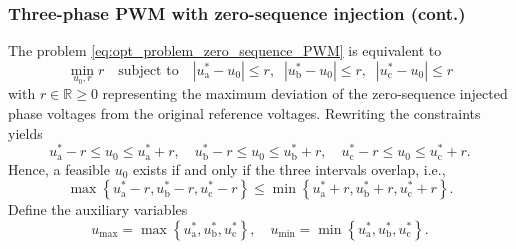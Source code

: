 \begin{frame}
    \frametitle{Three-phase PWM with zero-sequence injection (cont.)}
    The problem \eqref{eq:opt_problem_zero_sequence_PWM} is equivalent to
    \begin{equation}
        \min_{u_0, r} r \quad \text{subject to} \quad |u^*_\mathrm{a}-u_0| \leq r, \;\; |u^*_\mathrm{b}-u_0| \leq r, \;\; |u^*_\mathrm{c}-u_0| \leq r
    \end{equation}
    with $r\in\mathbb{R}\geq 0$ representing the maximum deviation of the zero-sequence injected phase voltages from the original reference voltages. \pause Rewriting the constraints yields
    \begin{equation}
        u_\mathrm{a}^* - r \leq u_0 \leq u_\mathrm{a}^* + r, \quad u_\mathrm{b}^* - r \leq u_0 \leq u_\mathrm{b}^* + r, \quad u_\mathrm{c}^* - r \leq u_0 \leq u_\mathrm{c}^* + r.
    \end{equation}\pause%
    Hence, a feasible $u_0$ exists if and only if the three intervals overlap, i.e.,
    \begin{equation}
        \max\left\{u^*_\mathrm{a}-r, u^*_\mathrm{b}-r, u^*_\mathrm{c}-r\right\} \leq \min\left\{u^*_\mathrm{a}+r, u^*_\mathrm{b}+r, u^*_\mathrm{c}+r\right\}.
        \label{eq:feasible_intervals_r_zero_volt_inject}
    \end{equation}\pause%
    Define the auxiliary variables
    \begin{equation}
        u_\mathrm{max} = \max\left\{u^*_\mathrm{a}, u^*_\mathrm{b}, u^*_\mathrm{c}\right\}, \quad u_\mathrm{min} = \min\left\{u^*_\mathrm{a}, u^*_\mathrm{b}, u^*_\mathrm{c}\right\}.
        \label{eq:aux_variables_zero_volt_inject}
    \end{equation}
\end{frame}

